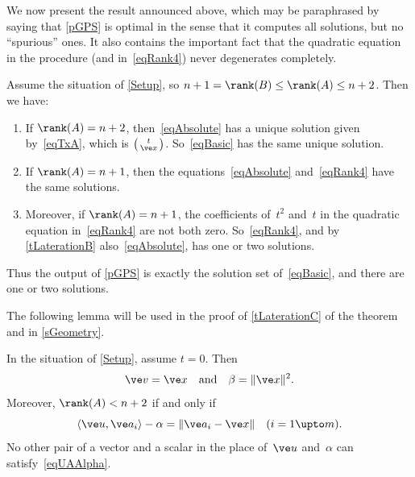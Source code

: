 \documentclass[reqno]{amsart}
\begin{document}
We now present the result announced above, which may be paraphrased by saying that \cref{pGPS} is optimal in the sense that it computes all solutions, but no ``spurious'' ones. It also contains the important fact that the quadratic equation in the procedure (and in~\eqref{eqRank4}) never degenerates completely.

\begin{theorem} \label{tLateration}%
  Assume the situation of \cref{Setup}, so
  $n+1 = \rank(B) \le \rank(A) \le n+2$. Then we have:
  \begin{enumerate}[label=(\alph*)]
  \item \label{tLaterationA} If $\rank(A) = n+2$,
    then~\eqref{eqAbsolute} has a unique solution given
    by~\eqref{eqTxA}, which is
    $\left(\begin{smallmatrix} t \\ \ve
        x\end{smallmatrix}\right)$. So~\eqref{eqBasic} has the same
    unique solution.
  \item \label{tLaterationB} If $\rank(A) = n+1$, then the
    equations~\eqref{eqAbsolute} and~\eqref{eqRank4} have the same
    solutions.
  \item \label{tLaterationC} Moreover, if $\rank(A) = n+1$, the
    coefficients of~$t^2$ and~$t$ in the quadratic equation
    in~\eqref{eqRank4} are not both zero. So~\eqref{eqRank4}, and by
    \cref{tLaterationB} also~\eqref{eqAbsolute}, has one or two
    solutions.
  \end{enumerate}
  Thus the output of \cref{pGPS} is exactly the solution set of~\eqref{eqBasic}, and there are one or two solutions.
\end{theorem}

The following lemma will be used in the proof of \cref{tLaterationC}
of the theorem and in \cref{sGeometry}.

\begin{lemma} \label{lSide}%
  In the situation of \cref{Setup}, assume $t = 0$. Then
  \begin{equation} \label{eqVBeta}%
    \ve v = \ve x \quad \text{and} \quad \beta = \lVert\ve x\rVert^2.
  \end{equation}
  Moreover, $\rank(A) < n+2$ if and only if
  \begin{equation} \label{eqUAAlpha}
    \langle\ve u,\ve a_i\rangle - \alpha = \lVert\ve a_i - \ve x\rVert \quad
    (i = 1 \upto m).
  \end{equation}
  No other pair of a vector and a scalar in the place of~$\ve u$
  and~$\alpha$ can satisfy~\eqref{eqUAAlpha}.
\end{lemma}
\end{document}
